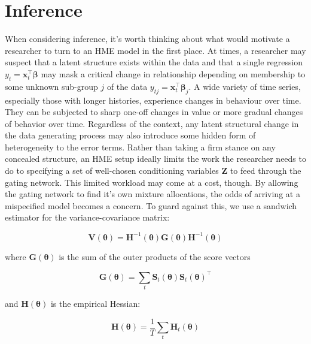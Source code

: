 \documentclass[12pt]{article}
\newcommand{\Ht}[1]{\mathbf{H}_{t}(#1)}
\newcommand{\HH}[1]{\boldsymbol{H}(#1)}
\newcommand{\HI}[1]{\boldsymbol{H}^{-1}(#1)}
\begin{document}
\section{Inference} \label{sec:Inference}

When considering inference, it's worth thinking about what would motivate
a researcher to turn to an HME model in the first place. At times,
a researcher may suspect that a latent structure exists within the data
and that a single regression $y_{t} = \boldsymbol{x}^{\top}_{t} \boldsymbol{\beta}$
may mask a critical change in relationship depending on membership to
some unknown sub-group $j$ of the data $y_{tj} = \boldsymbol{x}^{\top}_{t} \boldsymbol{\beta}_{j}$.
A wide variety of time series, especially those with longer histories,
experience changes in behaviour over time. They can be subjected to sharp one-off
changes in value or more gradual changes of behavior over time. Regardless of
the context, any latent structural change in the data generating
process may also introduce some hidden form of heterogeneity to the error terms. 
Rather than taking a firm stance on any concealed structure, an HME
setup ideally limits the work the researcher needs to do to specifying
a set of well-chosen conditioning variables $\boldsymbol{Z}$ to feed through the gating
network. This limited workload may come at a cost, though. By allowing the 
gating network to find it's own mixture allocations, the odds of arriving at a
mispecified model becomes a concern. To guard against this, we use a sandwich
estimator for the variance-covariance matrix:

\begin{equation} \label{eq:robustgatevarcov}
  \boldsymbol{V}(\boldsymbol{\theta}) = \HI{\boldsymbol{\theta}} \boldsymbol{G}(\boldsymbol{\theta}) \HI{\boldsymbol{\theta}}
\end{equation}



where $\boldsymbol{G}(\boldsymbol{\theta})$ is the sum of the outer products of the score 
vectors

\begin{equation}
  \boldsymbol{G}(\boldsymbol{\theta}) = \sum_{t} \boldsymbol{S}_{t}(\boldsymbol{\theta}) \boldsymbol{S}_{t}(\boldsymbol{\theta})^\top
\end{equation}

and $\HH{\boldsymbol{\theta}}$ is the empirical Hessian:

\begin{equation}
  \HH{\boldsymbol{\theta}} = \frac{1}{T} \sum_{t} \Ht{\boldsymbol{\theta}}
\end{equation}
\end{document}
